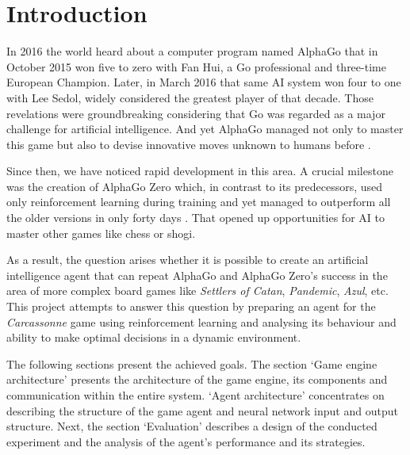 \section{Introduction}
\label{chap:introduction}

In 2016 the world heard about a computer program named AlphaGo that in October 2015
won five to zero with Fan Hui, a Go professional and three-time European Champion. Later,
in March 2016 that same AI system won four to one with Lee Sedol, widely considered the
greatest player of that decade. Those revelations were groundbreaking considering that Go
was regarded as a major challenge for artificial intelligence. And yet AlphaGo managed not
only to master this game but also to devise innovative moves unknown to humans before \cite{AlphaGoBlog}.

Since then, we have noticed rapid development in this area. A crucial milestone was
the creation of AlphaGo Zero which, in contrast to its predecessors, used only reinforcement
learning during training and yet managed to outperform all the older versions in only forty
days \cite{AlphaGoZeroBlog}. That opened up opportunities for AI to master other games like chess 
or shogi.

As a result, the question arises whether it is possible to create an artificial intelligence
agent that can repeat AlphaGo and AlphaGo Zero's success in the area of more complex
board games like \textit{Settlers of Catan}, \textit{Pandemic}, \textit{Azul}, etc. This 
project attempts to answer this question by preparing an agent for the \textit{Carcassonne} game 
using reinforcement learning and analysing its behaviour and ability to make optimal 
decisions in a dynamic environment.

The following sections present the achieved goals. The section `Game engine architecture' 
presents the architecture of the game engine, its components and communication within the entire system. `Agent architecture' 
concentrates on describing the structure of the game agent and neural network input and
output structure. Next, the section `Evaluation' describes a design of the conducted experiment 
and the analysis of the agent's performance and its strategies.
